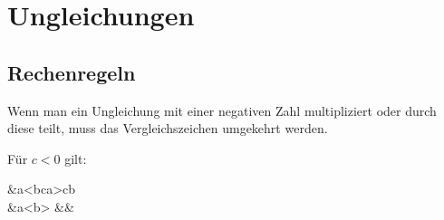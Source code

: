 \documentclass[12pt]{article}
\begin{document}
\section{Ungleichungen}
	\subsection{Rechenregeln}
	\label{subsec:unglrechrgl}
		Wenn man ein Ungleichung mit einer negativen Zahl multipliziert oder durch diese teilt, muss das Vergleichszeichen umgekehrt werden.
		\begin{tcolorbox}[boxsep=0pt,top=.75cm,left=1cm,right=1cm, bottom=.65cm,arc=0pt,auto outer arc,colback=white,colframe=black, enlarge top by=.25cm, enlarge bottom by=.25cm]
			Für $c<0$ gilt:
			\begin{flalign*}
				&a<b\iff c\cdot  a>c\cdot b\\
				&a<b\iff {}> &&
			\end{flalign*}
		\end{tcolorbox}
\end{document}
